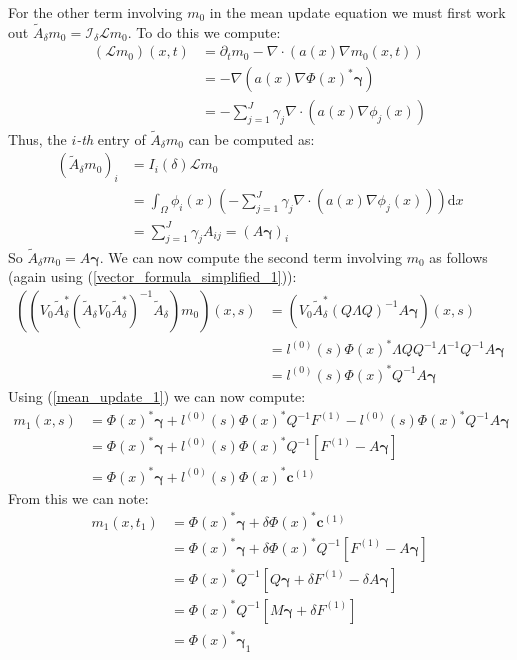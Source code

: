 \documentclass{article}
\theoremstyle{definition}
\theoremstyle{remark}
\theoremstyle{remark}
\begin{document}
\noindent For the other term involving $m_0$ in the mean update equation we must first work out $\tilde{A}_{\delta}m_{0}=\mathcal{I}_{\delta}\mathcal{L}m_{0}$. To do this we compute:
\begin{align*}
    (\mathcal{L}m_{0})(x,t)&=\partial_{t}m_{0}-\nabla\cdot(a(x)\nabla m_{0}(x,t)) \\
    &=-\nabla(a(x)\nabla\Phi(x)^{*}\boldsymbol{\gamma}) \\
    &=-\sum_{j=1}^{J}\gamma_{j}\nabla\cdot(a(x)\nabla\phi_{j}(x))
\end{align*}
Thus, the $i$\textit{-th} entry of $\tilde{A}_{\delta}m_{0}$ can be computed as:
\begin{align*}
    (\tilde{A}_{\delta}m_{0})_{i} &= I_{i}(\delta)\mathcal{L}m_{0} \\
    &= \int_{\Omega}\phi_{i}(x)\left(-\sum_{j=1}^{J}\gamma_{j}\nabla\cdot(a(x)\nabla\phi_{j}(x))\right)\mathrm{d}x \\
    &= \sum_{j=1}^{J}\gamma_{j}A_{ij} = (A\boldsymbol{\gamma})_{i}
\end{align*}
So $\tilde{A}_{\delta}m_{0}=A\boldsymbol{\gamma}$.
We can now compute the second term involving $m_{0}$ as follows (again using (\ref{vector_formula_simplified_1})):
\begin{align*}
    ((V_{0}\tilde{A}_{\delta}^{*}(\tilde{A}_{\delta}V_{0}\tilde{A}_{\delta}^{*})^{-1}\tilde{A}_{\delta})m_{0})(x,s) &= (V_{0}\tilde{A}_{\delta}^{*}(Q\Lambda Q)^{-1}A\boldsymbol{\gamma})(x,s) \\
    &=l^{(0)}(s)\Phi(x)^{*}\Lambda QQ^{-1}\Lambda^{-1}Q^{-1}A\boldsymbol{\gamma}\\
    &=l^{(0)}(s)\Phi(x)^{*}Q^{-1}A\boldsymbol{\gamma}
\end{align*}
Using (\ref{mean_update_1}) we can now compute:
\begin{align*}
    m_1(x,s) &= \Phi(x)^{*}\boldsymbol{\gamma}+l^{(0)}(s)\Phi(x)^{*}Q^{-1}F^{(1)}-l^{(0)}(s)\Phi(x)^{*}Q^{-1}A\boldsymbol{\gamma} \\
    &=\Phi(x)^{*}\boldsymbol{\gamma}+l^{(0)}(s)\Phi(x)^{*}Q^{-1}\left[F^{(1)}-A\boldsymbol{\gamma}\right] \\
    &=\Phi(x)^{*}\boldsymbol{\gamma}+l^{(0)}(s)\Phi(x)^{*}\boldsymbol{c}^{(1)}
\end{align*}
From this we can note:
\begin{align*}
    m_{1}(x,t_{1}) &= \Phi(x)^{*}\boldsymbol{\gamma}+\delta\Phi(x)^{*}\boldsymbol{c}^{(1)} \\
    &= \Phi(x)^{*}\boldsymbol{\gamma}+\delta\Phi(x)^{*}Q^{-1}\left[F^{(1)}-A\boldsymbol{\gamma}\right] \\
    &= \Phi(x)^{*}Q^{-1}\left[Q\boldsymbol{\gamma}+\delta F^{(1)}-\delta A\boldsymbol{\gamma}\right] \\
    &= \Phi(x)^{*}Q^{-1}\left[M\boldsymbol{\gamma}+\delta F^{(1)}\right] \\
    &= \Phi(x)^{*}\boldsymbol{\gamma}_{1}
\end{align*}
\end{document}
